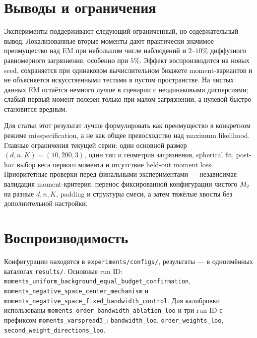 \documentclass[11pt,a4paper]{article}
\newcommand{\code}[1]{{\footnotesize\nolinkurl{#1}}}
\newcommand{\Mtwo}{M_2}
\begin{document}
\section{Выводы и ограничения}

Эксперименты поддерживают следующий ограниченный, но содержательный вывод.
Локализованные вторые моменты дают практически значимое преимущество над EM
при небольшом числе наблюдений и $2$--$10\%$ диффузного равномерного
загрязнения, особенно при $5\%$. Эффект воспроизводится на новых seed,
сохраняется при одинаковом вычислительном бюджете moment-вариантов и не
объясняется искусственными тестами в пустом пространстве. На чистых данных EM
остаётся немного лучше в сценарии с неодинаковыми дисперсиями; слабый первый
момент полезен только при малом загрязнении, а нулевой быстро становится
вредным.

Для статьи этот результат лучше формулировать как преимущество в конкретном
режиме misspecification, а не как общее превосходство над maximum likelihood.
Главные ограничения текущей серии: один основной размер
$(d,n,K)=(10,200,3)$, один тип и геометрия загрязнения, spherical fit,
post-hoc выбор веса первого момента и отсутствие held-out moment loss.
Приоритетные проверки перед финальными экспериментами --- независимая
валидация moment-критерия, перенос фиксированной конфигурации чистого $\Mtwo$
на разные $d,n,K$, padding и структуры смеси, а затем тяжёлые хвосты без
дополнительной настройки.

\section*{Воспроизводимость}

{\small
Конфигурации находятся в \code{experiments/configs/}, результаты --- в
одноимённых каталогах \code{results/}. Основные run ID:
\code{moments_uniform_background_equal_budget_confirmation},
\code{moments_negative_space_center_mechanism} и
\code{moments_negative_space_fixed_bandwidth_control}. Для калибровки
использованы \code{moments_order_bandwidth_ablation_loo} и три run ID с
префиксом \code{moments_varspread3_}: \code{bandwidth_loo},
\code{order_weights_loo}, \code{second_weight_directions_loo}.
}
\end{document}
